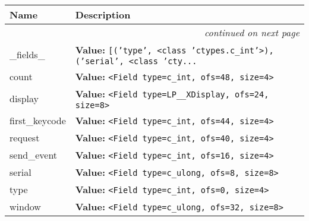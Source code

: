     \vspace{-1cm}
\hspace{\varindent}\begin{longtable}{|p{\varnamewidth}|p{\vardescrwidth}|l}
\cline{1-2}
\cline{1-2} \centering \textbf{Name} & \centering \textbf{Description}& \\
\cline{1-2}
\endhead\cline{1-2}\multicolumn{3}{r}{\small\textit{continued on next page}}\\\endfoot\cline{1-2}
\endlastfoot\raggedright \_\-f\-i\-e\-l\-d\-s\-\_\- & \raggedright \textbf{Value:} 
{\tt \texttt{[}\texttt{(}\texttt{'}\texttt{type}\texttt{'}\texttt{, }{\textless}class 'ctypes.c\_int'{\textgreater}\texttt{)}\texttt{, }\texttt{(}\texttt{'}\texttt{serial}\texttt{'}\texttt{, }{\textless}class 'cty\texttt{...}}&\\
\cline{1-2}
\raggedright c\-o\-u\-n\-t\- & \raggedright \textbf{Value:} 
{\tt {\textless}Field type=c\_int, ofs=48, size=4{\textgreater}}&\\
\cline{1-2}
\raggedright d\-i\-s\-p\-l\-a\-y\- & \raggedright \textbf{Value:} 
{\tt {\textless}Field type=LP\_\_XDisplay, ofs=24, size=8{\textgreater}}&\\
\cline{1-2}
\raggedright f\-i\-r\-s\-t\-\_\-k\-e\-y\-c\-o\-d\-e\- & \raggedright \textbf{Value:} 
{\tt {\textless}Field type=c\_int, ofs=44, size=4{\textgreater}}&\\
\cline{1-2}
\raggedright r\-e\-q\-u\-e\-s\-t\- & \raggedright \textbf{Value:} 
{\tt {\textless}Field type=c\_int, ofs=40, size=4{\textgreater}}&\\
\cline{1-2}
\raggedright s\-e\-n\-d\-\_\-e\-v\-e\-n\-t\- & \raggedright \textbf{Value:} 
{\tt {\textless}Field type=c\_int, ofs=16, size=4{\textgreater}}&\\
\cline{1-2}
\raggedright s\-e\-r\-i\-a\-l\- & \raggedright \textbf{Value:} 
{\tt {\textless}Field type=c\_ulong, ofs=8, size=8{\textgreater}}&\\
\cline{1-2}
\raggedright t\-y\-p\-e\- & \raggedright \textbf{Value:} 
{\tt {\textless}Field type=c\_int, ofs=0, size=4{\textgreater}}&\\
\cline{1-2}
\raggedright w\-i\-n\-d\-o\-w\- & \raggedright \textbf{Value:} 
{\tt {\textless}Field type=c\_ulong, ofs=32, size=8{\textgreater}}&\\
\cline{1-2}
\end{longtable}


